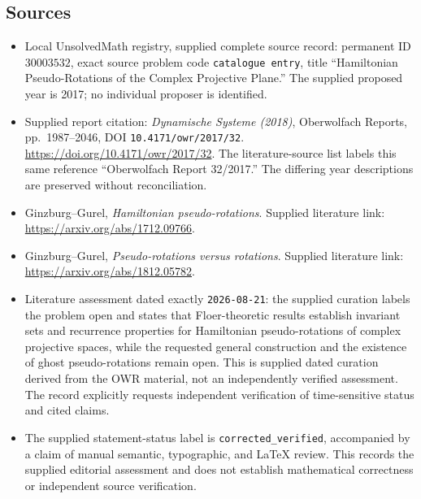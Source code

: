 \documentclass[11pt]{article}
\begin{document}
\subsection{Sources}
\begin{itemize}
\item Local UnsolvedMath registry, supplied complete source record: permanent ID \(30003532\), exact source problem code \texttt{catalogue entry}, title ``Hamiltonian Pseudo-Rotations of the Complex Projective Plane.'' The supplied proposed year is 2017; no individual proposer is identified.
\item Supplied report citation: \emph{Dynamische Systeme (2018)}, Oberwolfach Reports, pp.\ 1987--2046, DOI \texttt{10.4171/owr/2017/32}. \url{https://doi.org/10.4171/owr/2017/32}. The literature-source list labels this same reference ``Oberwolfach Report 32/2017.'' The differing year descriptions are preserved without reconciliation.
\item Ginzburg--Gurel, \emph{Hamiltonian pseudo-rotations}. Supplied literature link: \url{https://arxiv.org/abs/1712.09766}.
\item Ginzburg--Gurel, \emph{Pseudo-rotations versus rotations}. Supplied literature link: \url{https://arxiv.org/abs/1812.05782}.
\item Literature assessment dated exactly \texttt{2026-08-21}: the supplied curation labels the problem open and states that Floer-theoretic results establish invariant sets and recurrence properties for Hamiltonian pseudo-rotations of complex projective spaces, while the requested general construction and the existence of ghost pseudo-rotations remain open. This is supplied dated curation derived from the OWR material, not an independently verified assessment. The record explicitly requests independent verification of time-sensitive status and cited claims.
\item The supplied statement-status label is \texttt{corrected\_verified}, accompanied by a claim of manual semantic, typographic, and LaTeX review. This records the supplied editorial assessment and does not establish mathematical correctness or independent source verification.
\end{itemize}
\end{document}
